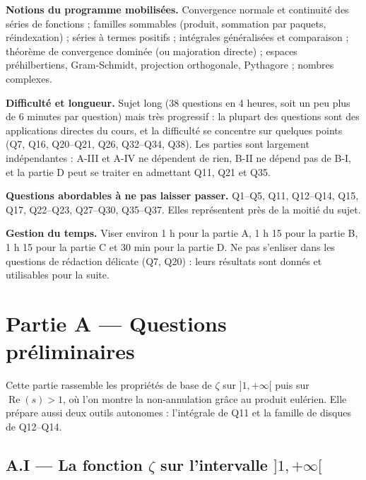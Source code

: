 \documentclass[11pt,a4paper]{article}
\begin{document}
\textbf{Notions du programme mobilisées.} Convergence normale et continuité des séries de fonctions ; familles sommables (produit, sommation par paquets, réindexation) ; séries à termes positifs ; intégrales généralisées et comparaison ; théorème de convergence dominée (ou majoration directe) ; espaces préhilbertiens, Gram-Schmidt, projection orthogonale, Pythagore ; nombres complexes.

\textbf{Difficulté et longueur.} Sujet long (38 questions en 4 heures, soit un peu plus de 6 minutes par question) mais très progressif : la plupart des questions sont des applications directes du cours, et la difficulté se concentre sur quelques points (Q7, Q16, Q20--Q21, Q26, Q32--Q34, Q38). Les parties sont largement indépendantes : A-III et A-IV ne dépendent de rien, B-II ne dépend pas de B-I, et la partie D peut se traiter en admettant Q11, Q21 et Q35.

\textbf{Questions abordables à ne pas laisser passer.} Q1--Q5, Q11, Q12--Q14, Q15, Q17, Q22--Q23, Q27--Q30, Q35--Q37. Elles représentent près de la moitié du sujet.

\textbf{Gestion du temps.} Viser environ 1 h pour la partie A, 1 h 15 pour la partie B, 1 h 15 pour la partie C et 30 min pour la partie D. Ne pas s'enliser dans les questions de rédaction délicate (Q7, Q20) : leurs résultats sont donnés et utilisables pour la suite.

\hypertarget{partie-a-questions-pruxe9liminaires}{%
\section{Partie A --- Questions préliminaires}\label{partie-a-questions-pruxe9liminaires}}

Cette partie rassemble les propriétés de base de \(\zeta\) sur \(]1,+\infty[\) puis sur \(\operatorname{Re}(s)>1\), où l'on montre la non-annulation grâce au produit eulérien. Elle prépare aussi deux outils autonomes : l'intégrale de Q11 et la famille de disques de Q12--Q14.

\hypertarget{a.i-la-fonction-zeta-sur-lintervalle-1infty}{%
\subsection{\texorpdfstring{A.I --- La fonction \(\zeta\) sur l'intervalle \(]1,+\infty[\)}{A.I --- La fonction \textbackslash zeta sur l'intervalle {]}1,+\textbackslash infty{[}}}\label{a.i-la-fonction-zeta-sur-lintervalle-1infty}}
\end{document}
